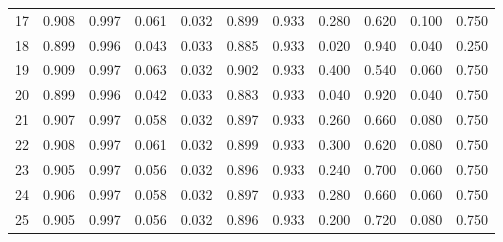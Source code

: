 \begin{landscape}
\begin{table}[htbp]
{\begin{tabular}{lrrrrrrrrrr}
17 & 0.908 & 0.997 & 0.061 & 0.032 & 0.899 & 0.933 & 0.280 & 0.620 & 0.100 & 0.750 \\
18 & 0.899 & 0.996 & 0.043 & 0.033 & 0.885 & 0.933 & 0.020 & 0.940 & 0.040 & 0.250 \\
19 & 0.909 & 0.997 & 0.063 & 0.032 & 0.902 & 0.933 & 0.400 & 0.540 & 0.060 & 0.750 \\
20 & 0.899 & 0.996 & 0.042 & 0.033 & 0.883 & 0.933 & 0.040 & 0.920 & 0.040 & 0.750 \\
21 & 0.907 & 0.997 & 0.058 & 0.032 & 0.897 & 0.933 & 0.260 & 0.660 & 0.080 & 0.750 \\
22 & 0.908 & 0.997 & 0.061 & 0.032 & 0.899 & 0.933 & 0.300 & 0.620 & 0.080 & 0.750 \\
23 & 0.905 & 0.997 & 0.056 & 0.032 & 0.896 & 0.933 & 0.240 & 0.700 & 0.060 & 0.750 \\
24 & 0.906 & 0.997 & 0.058 & 0.032 & 0.897 & 0.933 & 0.280 & 0.660 & 0.060 & 0.750 \\
25 & 0.905 & 0.997 & 0.056 & 0.032 & 0.896 & 0.933 & 0.200 & 0.720 & 0.080 & 0.750 \\
\bottomrule
\end{tabular}
}
\end{table}
\end{landscape}
